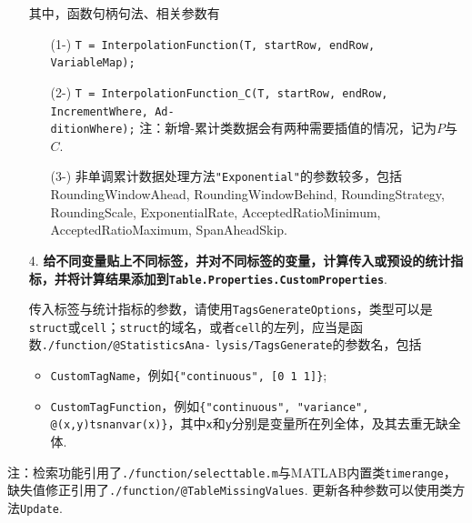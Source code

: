 \documentclass[a4paper, titlepage]{article}
\begin{document}
\begin{enumerate}
{        其中，函数句柄句法、相关参数有
        \begin{enumerate}
            \item [(1-)]\texttt{T = InterpolationFunction(T, startRow, endRow, VariableMap);}
            \item [(2-)]\texttt{T = InterpolationFunction\_C(T, startRow, endRow, IncrementWhere, Ad-}\\\texttt{ditionWhere);} 注：新增-累计类数据会有两种需要插值的情况，记为$P$与$C$.
            \item [(3-)] 非单调累计数据处理方法\texttt{"Exponential"}的参数较多，包括RoundingWindowAhead, RoundingWindowBehind, RoundingStrategy, RoundingScale, ExponentialRate, AcceptedRatioMinimum, AcceptedRatioMaximum, SpanAheadSkip.
        \end{enumerate}
        }
        
        \item [4.] \textbf{给不同变量贴上不同标签，并对不同标签的变量，计算传入或预设的统计指标，并将计算结果添加到\texttt{Table.Properties.CustomProperties}}.
        
        {\kaishu
        传入标签与统计指标的参数，请使用\texttt{TagsGenerateOptions}，类型可以是\texttt{struct}或\texttt{cell}；\texttt{struct}的域名，或者\texttt{cell}的左列，应当是函数\texttt{./function/@StatisticsAna-} \texttt{lysis/TagsGenerate}的参数名，包括
        \begin{itemize}[itemsep=-1pt,topsep=1pt]
            \item \texttt{CustomTagName}，例如\texttt{\{"continuous", [0 1 1]\}};
            \item \texttt{CustomTagFunction}，例如\texttt{\{"continuous", "variance", @(x,y)tsnanvar(x)\}}，其中\texttt{x}和\texttt{y}分别是变量所在列全体，及其去重无缺全体.
        \end{itemize} 
        }
    \end{enumerate}

    注：检索功能引用了\texttt{./function/selecttable.m}与MATLAB内置类\texttt{timerange}，缺失值修正引用了\texttt{./function/@TableMissingValues}. 更新各种参数可以使用类方法\texttt{Update}.
\end{document}
